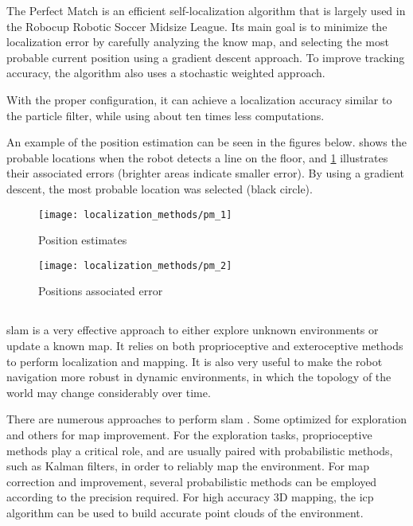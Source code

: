 The Perfect Match \cite{Lauer2006a,Pinto1963} is an efficient self-localization algorithm that is largely used in the Robocup Robotic Soccer Midsize League. Its main goal is to minimize the localization error by carefully analyzing the know map, and selecting the most probable current position using a gradient descent approach. To improve tracking accuracy, the algorithm also uses a stochastic weighted approach.

With the proper configuration, it can achieve a localization accuracy similar to the particle filter, while using about ten times less computations.

An example of the position estimation can be seen in the figures below.  shows the probable locations when the robot detects a line on the floor, and \cref{fig:localization-methods_pm-2} illustrates their associated errors (brighter areas indicate smaller error). By using a gradient descent, the most probable location was selected (black circle).

\begin{figure}[H]
	\centering
	\begin{minipage}[h]{.495\textwidth}
		\centering
		\texttt{[image: localization\_methods/pm\_1]}
		\caption{Position estimates}
		\label{fig:localization-methods_pm-1}
	\end{minipage}\hfill
	\begin{minipage}[h]{.495\textwidth}
		\centering
		\texttt{[image: localization\_methods/pm\_2]}
		\caption{Positions associated error}
		\label{fig:localization-methods_pm-2}
	\end{minipage}
\end{figure}


\subsection{}

\gls{slam} \cite{Thrun2002} is a very effective approach to either explore unknown environments or update a known map. It relies on both proprioceptive and exteroceptive methods to perform localization and mapping. It is also very useful to make the robot navigation more robust in dynamic environments, in which the topology of the world may change considerably over time.

There are numerous approaches to perform  \gls{slam} \cite{Tuna2012}. Some optimized for exploration and others for map improvement. For the exploration tasks, proprioceptive methods play a critical role, and are usually paired with probabilistic methods, such as Kalman filters, in order to reliably map the environment. For map correction and improvement, several probabilistic methods can be employed according to the precision required. For high accuracy 3D mapping, the \gls{icp} algorithm can be used to build accurate point clouds of the environment.



